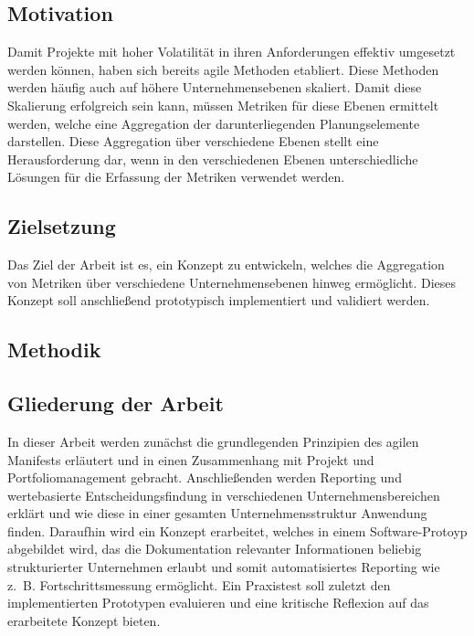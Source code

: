 \subsection{Motivation}
Damit Projekte mit hoher Volatilität in ihren Anforderungen effektiv umgesetzt werden können, haben sich bereits agile Methoden etabliert. Diese Methoden werden häufig auch auf höhere Unternehmensebenen skaliert. Damit diese Skalierung erfolgreich sein kann, müssen Metriken für diese Ebenen ermittelt werden, welche eine Aggregation der darunterliegenden Planungselemente darstellen. Diese Aggregation über verschiedene Ebenen stellt eine Herausforderung dar, wenn in den verschiedenen Ebenen unterschiedliche Lösungen für die Erfassung der Metriken verwendet werden.

\subsection{Zielsetzung}
Das Ziel der Arbeit ist es, ein Konzept zu entwickeln, welches die Aggregation von Metriken über verschiedene Unternehmensebenen hinweg ermöglicht. Dieses Konzept soll anschließend prototypisch implementiert und validiert werden.

\subsection{Methodik}


\subsection{Gliederung der Arbeit}
In dieser Arbeit werden zunächst die grundlegenden Prinzipien des agilen Manifests erläutert und in einen Zusammenhang mit Projekt und Portfoliomanagement gebracht. Anschließenden werden Reporting und wertebasierte Entscheidungsfindung in verschiedenen Unternehmensbereichen erklärt und wie diese in einer gesamten Unternehmensstruktur Anwendung finden. Daraufhin wird ein Konzept erarbeitet, welches in einem Software-Protoyp abgebildet wird, das die Dokumentation relevanter Informationen beliebig strukturierter Unternehmen erlaubt und somit automatisiertes Reporting wie z. B. Fortschrittsmessung ermöglicht. Ein Praxistest soll zuletzt den implementierten Prototypen evaluieren und eine kritische Reflexion auf das erarbeitete Konzept bieten.